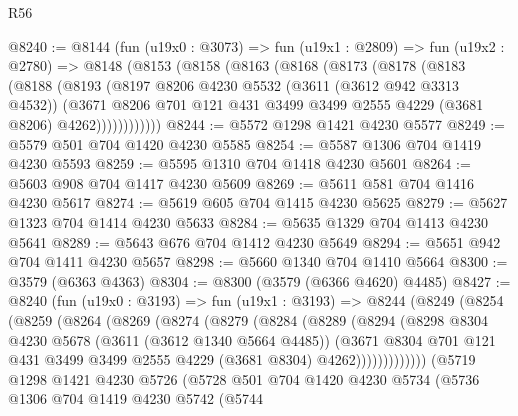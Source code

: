 \begin{lexlean}{R56}
\begin{coremodule}
@8240 := @8144
    (fun (u19x0 : @3073) =>
    fun (u19x1 : @2809) =>
    fun (u19x2 : @2780) =>
    @8148
      (@8153
        (@8158
          (@8163
            (@8168
              (@8173
                (@8178
                  (@8183
                    (@8188
                      (@8193
                        (@8197
                          @8206
                          @4230
                          @5532
                          (@3611 (@3612 @942 @3313 @4532))
                          (@3671
                            @8206
                            @701
                            @121
                            @431
                            @3499
                            @3499
                            @2555
                            @4229
                            (@3681 @8206)
                            @4262))))))))))))
@8244 := @5572 @1298 @1421 @4230 @5577
@8249 := @5579 @501 @704 @1420 @4230 @5585
@8254 := @5587 @1306 @704 @1419 @4230 @5593
@8259 := @5595 @1310 @704 @1418 @4230 @5601
@8264 := @5603 @908 @704 @1417 @4230 @5609
@8269 := @5611 @581 @704 @1416 @4230 @5617
@8274 := @5619 @605 @704 @1415 @4230 @5625
@8279 := @5627 @1323 @704 @1414 @4230 @5633
@8284 := @5635 @1329 @704 @1413 @4230 @5641
@8289 := @5643 @676 @704 @1412 @4230 @5649
@8294 := @5651 @942 @704 @1411 @4230 @5657
@8298 := @5660 @1340 @704 @1410 @5664
@8300 := @3579 (@6363 @4363)
@8304 := @8300 (@3579 (@6366 @4620) @4485)
@8427 := @8240
    (fun (u19x0 : @3193) =>
    fun (u19x1 : @3193) =>
    @8244
      (@8249
        (@8254
          (@8259
            (@8264
              (@8269
                (@8274
                  (@8279
                    (@8284
                      (@8289
                        (@8294
                          (@8298
                            @8304
                            @4230
                            @5678
                            (@3611 (@3612 @1340 @5664 @4485))
                            (@3671
                              @8304
                              @701
                              @121
                              @431
                              @3499
                              @3499
                              @2555
                              @4229
                              (@3681 @8304)
                              @4262)))))))))))))
    (@5719
      @1298
      @1421
      @4230
      @5726
      (@5728
        @501
        @704
        @1420
        @4230
        @5734
        (@5736
          @1306
          @704
          @1419
          @4230
          @5742
          (@5744

\end{coremodule}
\end{lexlean}
